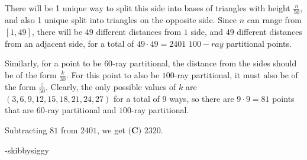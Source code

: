 \begin{enumerate}
 
There will be 1 unique way to split this side into bases of triangles with height $\frac{n}{50}$, and also 1 unique split into triangles on the opposite side. Since $n$ can range from $[1,49]$, there will be $49$ different distances from $1$ side, and $49$ different distances from an adjacent side, for a total of $49\cdot 49 = 2401$ $100-ray$ partitional points. 

 
Similarly, for a point to be $60$-ray partitional, the distance from the sides should be of the form $\frac{k}{30}$. For this point to also be $100$-ray partitional, it must also be of the form $\frac{z}{50}$. Clearly, the only possible values of $k$ are $(3,6,9,12,15,18,21,24,27)$ for a total of 9 ways, so there are $9\cdot 9 = 81$ points that are $60$-ray partitional and $100$-ray partitional.

 
Subtracting $81$ from $2401$, we get $\boxed{\textbf{(C) } 2320}$. 

 -skibbysiggy

 


\end{enumerate}